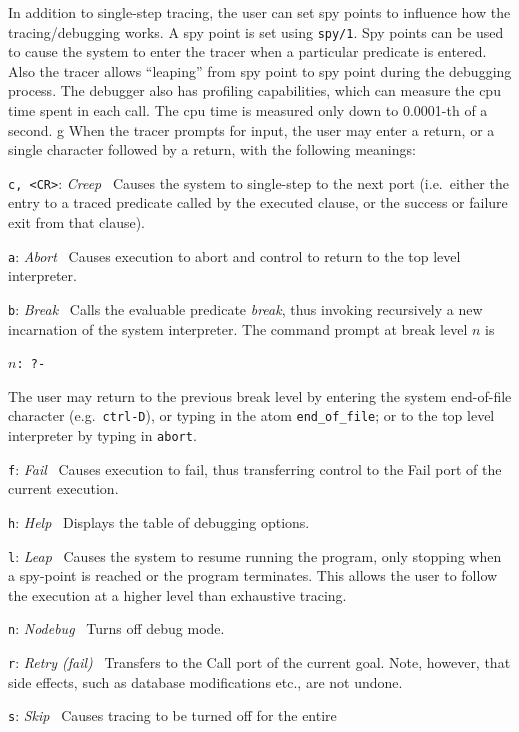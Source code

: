 \begin{description}
In addition to single-step tracing, the user can set spy points to
influence how the tracing/debugging works.  A spy point is set using
{\tt spy/1}.  Spy points can be used to cause the system to enter the
tracer when a particular predicate is entered. Also the tracer allows
``leaping'' from spy point to spy point during the debugging process.
%
The debugger also has profiling capabilities, which can measure the cpu
time spent in each call. The cpu time is measured only down to 0.0001-th
of a second.
g
When the tracer prompts for input, the user may enter a return, or a single
character followed by a return, with the following meanings:
\bi
{}
\item{\tt c, <CR>}: {\em Creep}~ Causes the system to single-step to
  the next port (i.e.\ either the entry to a traced predicate called
  by the executed clause, or the success or failure exit from that
  clause).
\item{\tt a}: {\em Abort}~  Causes execution to abort
  and control to return to the top level interpreter.
\item{\tt b}: {\em Break}~ Calls the evaluable predicate {\em break},
  thus invoking recursively a new incarnation of the system
  interpreter.  The command prompt at break level $n$ is
  \begin{center}
    {\tt $n$: \tt ?-}
  \end{center}
  The user may return to the previous break level by entering the system
  end-of-file character (e.g.\ {\tt ctrl-D}), or typing in the atom 
  {\tt end\_of\_file}; or to the top level interpreter by typing in
  {\tt abort}.
\item{\tt f}: {\em Fail}~ Causes execution to fail, thus transferring
  control to the Fail port of the current execution.
\item{\tt h}: {\em Help}~ Displays the table of debugging options.
\item{\tt l}: {\em Leap}~ Causes the system to resume running the
  program, only stopping when a spy-point is reached or the program
  terminates.  This allows the user to follow the execution at a
  higher level than exhaustive tracing.
\item{\tt n}: {\em Nodebug}~ Turns off debug mode.
\item{\tt r}: {\em Retry (fail)}~ Transfers to the Call port of the current
  goal.  Note, however, that side effects, such as database modifications
  etc., are not undone.
\item{\tt s}: {\em Skip}~ Causes tracing to be turned off for the entire

\end{description}
